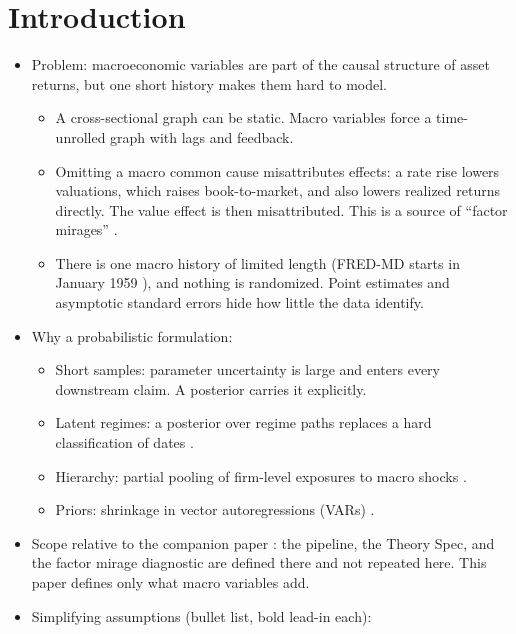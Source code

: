   \section{Introduction}\label{sec:introduction}

  \begin{itemize}
  \tightlist
  \item
    Problem: macroeconomic variables are part of the causal structure of
    asset returns, but one short history makes them hard to model.

    \begin{itemize}
    \tightlist
    \item
      A cross-sectional graph can be static. Macro variables force a
      time-unrolled graph with lags and feedback.
    \item
      Omitting a macro common cause misattributes effects: a rate rise
      lowers valuations, which raises book-to-market, and also lowers
      realized returns directly. The value effect is then misattributed.
      This is a source of ``factor mirages''
      \cite{lopezdeprado2025primer}.
    \item
      There is one macro history of limited length (FRED-MD starts in
      January 1959 \cite{fredmddb}), and nothing is randomized. Point
      estimates and asymptotic standard errors hide how little the data
      identify.
    \end{itemize}
  \item
    Why a probabilistic formulation:

    \begin{itemize}
    \tightlist
    \item
      Short samples: parameter uncertainty is large and enters every
      downstream claim. A posterior carries it explicitly.
    \item
      Latent regimes: a posterior over regime paths replaces a hard
      classification of dates \cite{hamilton1989new,sims2006were}.
    \item
      Hierarchy: partial pooling of firm-level exposures to macro shocks
      \cite{gelman2007data}.
    \item
      Priors: shrinkage in vector autoregressions (VARs)
      \cite{doan1984forecasting,banbura2010large,giannone2015prior}.
    \end{itemize}
  \item
    Scope relative to the companion paper \cite{adia2026finance}: the
    pipeline, the Theory Spec, and the factor mirage diagnostic are defined
    there and not repeated here. This paper defines only what macro
    variables add.
  \item
    Simplifying assumptions (bullet list, bold lead-in each):


\end{itemize}
